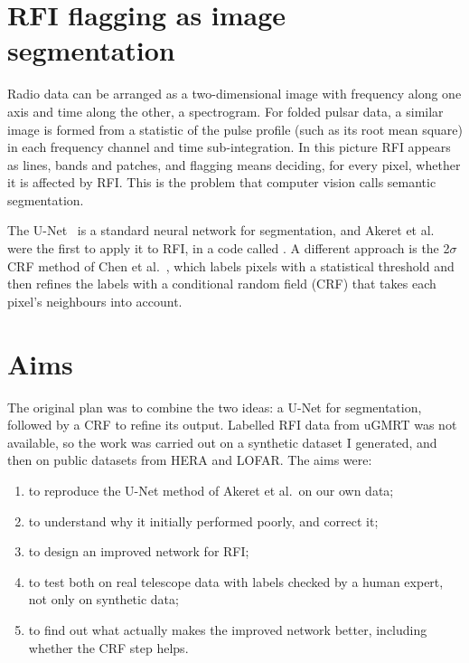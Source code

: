 \section{RFI flagging as image segmentation}
Radio data can be arranged as a two-dimensional image with frequency along one
axis and time along the other, a spectrogram. For folded pulsar data, a
similar image is formed from a statistic of the pulse profile (such as its root
mean square) in each frequency channel and time sub-integration. In this
picture RFI appears as lines, bands and patches, and flagging means deciding,
for every pixel, whether it is affected by RFI. This is the problem that
computer vision calls semantic segmentation.

The U-Net~\cite{ronneberger2015} is a standard neural network for segmentation,
and Akeret et al.~\cite{akeret2017} were the first to apply it to RFI, in a
code called \tfunet{}. A different approach is the 2$\sigma$CRF method of Chen
et al.~\cite{chen2023}, which labels pixels with a statistical threshold and
then refines the labels with a conditional random field (CRF) that takes each
pixel's neighbours into account.

\section{Aims}
The original plan was to combine the two ideas: a U-Net for segmentation,
followed by a CRF to refine its output. Labelled RFI data from uGMRT was not
available, so the work was carried out on a synthetic dataset I generated, and
then on public datasets from HERA and LOFAR. The aims were:
\begin{enumerate}
  \item to reproduce the U-Net method of Akeret et al.\ on our own data;
  \item to understand why it initially performed poorly, and correct it;
  \item to design an improved network for RFI;
  \item to test both on real telescope data with labels checked by a human
    expert, not only on synthetic data;
  \item to find out what actually makes the improved network better, including
    whether the CRF step helps.
\end{enumerate}

